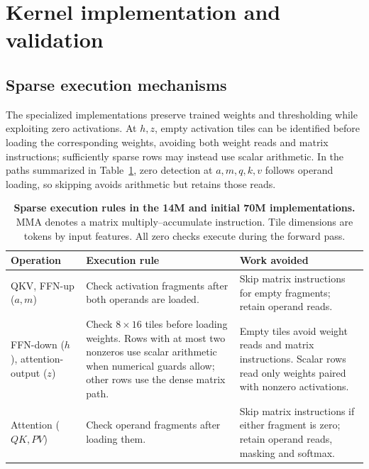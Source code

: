 \section{Kernel implementation and validation}
\label{app:kernel-results}
\label{app}
\label{app:kernel-diagnostics}

\subsection{Sparse execution mechanisms}
The specialized implementations preserve trained weights and thresholding while exploiting zero activations. At $h,z$, empty activation tiles can be identified before loading the corresponding weights, avoiding both weight reads and matrix instructions; sufficiently sparse rows may instead use scalar arithmetic. In the paths summarized in Table~\ref{tab:kernel-paths}, zero detection at $a,m,q,k,v$ follows operand loading, so skipping avoids arithmetic but retains those reads.

\begin{table}[!htb]
\centering\small
\caption{\textbf{Sparse execution rules in the 14M and initial 70M implementations.}
MMA denotes a matrix multiply--accumulate instruction. Tile dimensions are
tokens by input features. All zero checks execute during the forward pass.}
\label{tab:kernel-paths}
\begin{tabularx}{\linewidth}{@{}>{\raggedright\arraybackslash}p{.24\linewidth}>{\raggedright\arraybackslash}X>{\raggedright\arraybackslash}X@{}}
\toprule
Operation & Execution rule & Work avoided \\
\midrule
QKV, FFN-up ($a,m$) & Check activation fragments after both operands are loaded.
& Skip matrix instructions for empty fragments; retain operand reads. \\
FFN-down ($h$), attention-output ($z$) & Check $8\times16$ tiles before loading
weights. Rows with at most two nonzeros use scalar arithmetic when numerical
guards allow; other rows use the dense matrix path.
& Empty tiles avoid weight reads and matrix instructions. Scalar rows read
only weights paired with nonzero activations. \\
Attention ($QK,PV$) & Check operand fragments after loading them.
& Skip matrix instructions if either fragment is zero; retain operand reads,
masking and softmax. \\
\bottomrule
\end{tabularx}
\end{table}

